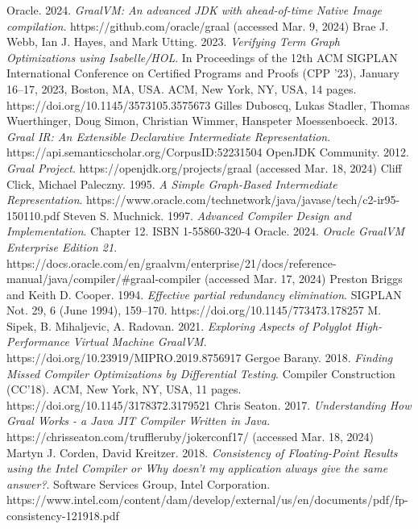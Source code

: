 \documentclass[12pt,openany,a4paper]{book}
\begin{document}
\begin{thebibliography}{99}
 Oracle. 2024. \emph{GraalVM: An advanced JDK with ahead-of-time Native Image compilation}. https://github.com/oracle/graal (accessed Mar. 9, 2024)
 Brae J. Webb, Ian J. Hayes, and Mark Utting. 2023. \emph{Verifying Term Graph Optimizations using Isabelle/HOL}. In Proceedings of the 12th ACM SIGPLAN International Conference on Certified Programs and Proofs (CPP ’23), January 16–17, 2023, Boston, MA, USA. ACM, New York, NY, USA, 14 pages. https://doi.org/10.1145/3573105.3575673
 Gilles Duboscq, Lukas Stadler, Thomas Wuerthinger, Doug Simon, Christian Wimmer, Hanspeter Moessenboeck. 2013. \emph{Graal IR: An Extensible Declarative Intermediate Representation}. https://api.semanticscholar.org/CorpusID:52231504
 OpenJDK Community. 2012. \emph{Graal Project}. https://openjdk.org/projects/graal (accessed Mar. 18, 2024)
 Cliff Click, Michael Paleczny. 1995. \emph{A Simple Graph-Based Intermediate Representation}. https://www.oracle.com/technetwork/java/javase/tech/c2-ir95-150110.pdf
 Steven S. Muchnick. 1997. \emph{Advanced Compiler Design and Implementation}. Chapter 12. ISBN 1-55860-320-4
 Oracle. 2024. \emph{Oracle GraalVM Enterprise Edition 21}. https://docs.oracle.com/en/graalvm/enterprise/21/docs/reference-manual/java/compiler/\#graal-compiler (accessed Mar. 17, 2024)
 Preston Briggs and Keith D. Cooper. 1994. \emph{Effective partial redundancy elimination}. SIGPLAN Not. 29, 6 (June 1994), 159–170. https://doi.org/10.1145/773473.178257
 M. Sipek, B. Mihaljevic, A. Radovan. 2021. \emph{Exploring Aspects of Polyglot High-Performance Virtual Machine GraalVM}. https://doi.org/10.23919/MIPRO.2019.8756917
 Gergoe Barany. 2018. \emph{Finding Missed Compiler Optimizations by Differential Testing}. Compiler Construction (CC’18). ACM, New York, NY, USA, 11 pages. https://doi.org/10.1145/3178372.3179521
 Chris Seaton. 2017. \emph{Understanding How Graal Works - a Java JIT Compiler Written in Java}. https://chrisseaton.com/truffleruby/jokerconf17/ (accessed Mar. 18, 2024)
 Martyn J. Corden, David Kreitzer. 2018. \emph{Consistency of Floating-Point Results using the Intel Compiler or Why doesn't my application always give the same answer?}. Software Services Group, Intel Corporation. https://www.intel.com/content/dam/develop/external/us/en/documents/pdf/fp-consistency-121918.pdf

\end{thebibliography}
\end{document}
